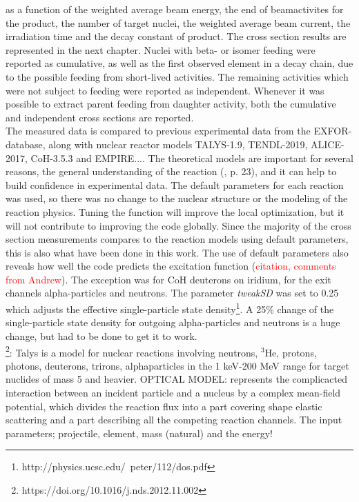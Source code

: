 as a function of the weighted average beam energy,  the end of beamactivites for the product, the number of target nuclei, the weighted average beam current, the irradiation time and the decay constant of product. The cross section results are represented in the next chapter. Nuclei with beta- or isomer feeding were reported as cumulative, as well as the first observed element in a decay chain, due to the possible feeding from short-lived activities. The remaining activities which were not subject to feeding were reported as independent. Whenever it was possible to extract parent feeding from daughter activity, both the cumulative and independent cross sections are reported. \\

\noindent 
The measured data is compared to previous experimental data from the EXFOR-database, along with nuclear reactor models TALYS-1.9, TENDL-2019, ALICE-2017\cite{Blann1996}, CoH-3.5.3 and EMPIRE.... The theoretical models are important for several reasons, the general understanding of the reaction (\cite{international2012iaea}, p. 23), and it can help to build confidence in experimental data. The default parameters for each reaction was used, so there was no change to the nuclear structure or the modeling of the reaction physics. Tuning the function will improve the local optimization, but it will not contribute to improving the code globally. Since the majority of the cross section measurements compares to the reaction models using default parameters, this is also what have been done in this work. The use of default parameters also reveals how well the code predicts the excitation function (\textcolor{red}{citation, comments from Andrew}). The exception was for CoH deuterons on iridium, for the exit channels alpha-particles and neutrons. The parameter \textit{tweakSD} was set to 0.25 which adjusts the effective single-particle state density\footnote{http://physics.ucsc.edu/~peter/112/dos.pdf}. A 25\% change of the single-particle state density for outgoing alpha-particles and neutrons is a huge change, but had to be done to get it to work. \\

\footnote{https://doi.org/10.1016/j.nds.2012.11.002}: Talys is a model for nuclear reactions involving neutrons, $^3$He, protons, photons, deuterons, trirons, alphaparticles in the 1 keV-200 MeV range for target nuclides of mass 5 and heavier. 
OPTICAL MODEL: represents the complicacted interaction between an incident particle and a nucleus by a complex mean-field potential, which divides the reaction flux into a part covering shape elastic scattering and a part describing all the competing reaction channels. The input parameters; projectile, element, mass (natural) and the energy! 

